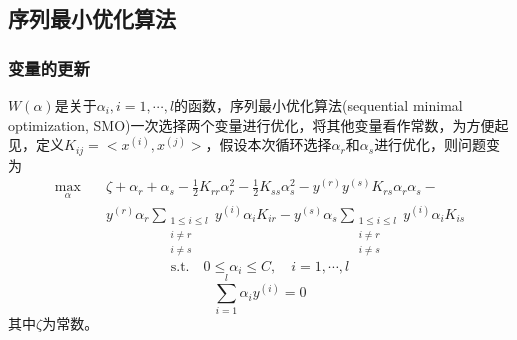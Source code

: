 \documentclass[supercite]{upcthesis}
\begin{document}
\subsection{序列最小优化算法}
\subsubsection{变量的更新}
$W(\alpha)$是关于$\alpha_{i}, i=1,\cdots,l$的函数，序列最小优化算法(sequential minimal optimization, SMO)\cite{Platt1999Fast}一次选择两个变量进行优化，将其他变量看作常数，为方便起见，定义$K_{ij}=<x^{(i)},x^{(j)}>$，假设本次循环选择$\alpha_{r}$和$\alpha_{s}$进行优化，则问题变为
\begin{equation}
\begin{split}
\max\limits_{\alpha} \quad &\zeta+\alpha_{r}+\alpha_{s}-\frac{1}{2}K_{rr}\alpha_{r}^{2}-\frac{1}{2}K_{ss}\alpha_{s}^{2}-y^{(r)}y^{(s)}K_{rs}\alpha_{r}\alpha_{s}-\\
&y^{(r)}\alpha_{r}\sum_{\substack{1 \leq i \leq l \\ i\neq r\\i \neq s }}y^{(i)}\alpha_{i}K_{ir}-y^{(s)}\alpha_{s}\sum_{\substack{1 \leq i \leq l \\ i\neq r\\i \neq s }}y^{(i)}\alpha_{i}K_{is}
\end{split}
\end{equation}
\[
\text{s.t.} \quad  0 \leq \alpha_{i} \leq C,\quad i=1,\cdots,l
\]
\[
\sum_{i=1}^{l} \alpha_{i}y^{(i)}=0
\]
其中$\zeta$为常数。
\end{document}
